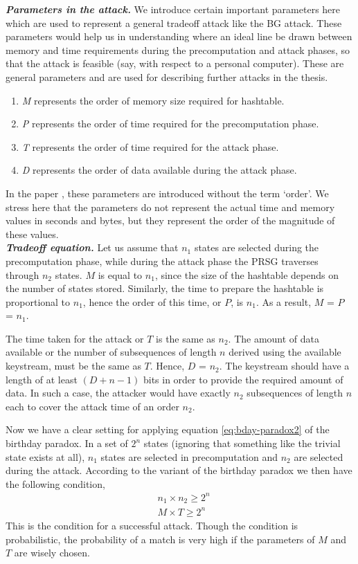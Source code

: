 \noindent \textit{\textbf{Parameters in the attack.}} We introduce certain important parameters here \cite{biryukov2000ctm} which are used to represent a general tradeoff attack like the BG attack. These parameters would help us in understanding where an ideal line be drawn between memory and time requirements during the precomputation and attack phases, so that the attack is feasible (say, with respect to a personal computer). These are general parameters and are used for describing further attacks in the thesis. 

\begin{enumerate}
\item \emph{M} represents the order of memory size required for hashtable.
\item \emph{P} represents the order of time required for the precomputation phase.
\item \emph{T} represents the order of time required for the attack phase.
\item \emph{D} represents the order of data available during the attack phase.
\end{enumerate}

In the paper \cite{biryukov2000ctm}, these parameters are introduced without the term \mbox{`order'}. We stress here that the parameters do not represent the actual time and memory values in seconds and bytes, but they represent the order of the magnitude of these values.\\

\noindent \textit{\textbf{Tradeoff equation.}} Let us assume that $n_1$ states are selected during the precomputation phase, while during the attack phase the PRSG traverses through $n_2$ states. $M$ is equal to $n_1$, since the size of the hashtable depends on the number of states stored. Similarly, the time to prepare the hashtable is proportional to $n_1$, hence the order of this time, or $P$, is $n_1$. As a result, $M$ = $P$ = $n_1$.

The time taken for the attack or $T$ is the same as $n_2$. The amount of data available or the number of subsequences of length $n$ derived using the available keystream, must be the same as $T$. Hence, $D$ = $n_2$. The keystream should have a length of at least $(D + n - 1)$ bits in order to provide the required amount of data. In such a case, the attacker would have exactly $n_2$ subsequences of length $n$ each to cover the attack time of an order $n_2$.

Now we have a clear setting for applying equation \ref{eq:bday-paradox2} of the birthday paradox. In a set of $2^n$ states (ignoring that something like the trivial state exists at all), $n_1$ states are selected in precomputation and $n_2$ are selected during the attack. According to the variant of the birthday paradox we then have the following condition,
\begin{align*}
& n_1 \times n_2 \geq 2^n\\
& M \times T \geq 2^n
\end{align*}
This is the condition for a successful attack. Though the condition is probabilistic, the probability of a match is very high if the parameters of $M$ and $T$ are wisely chosen.

